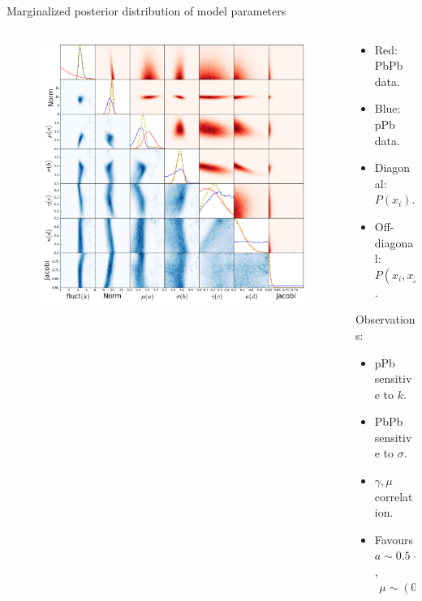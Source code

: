 \documentclass[11pt]{beamer}
\begin{document}
\begin{frame}{Marginalized posterior distribution of model parameters}
\begin{columns}
\begin{column}{0.6\textwidth}
\begin{figure}
\begin{center}
\includegraphics[width = \textwidth]{./pics/corner.png}
\end{center}
\end{figure}
\end{column}
\begin{column}{0.4\textwidth}
\begin{itemize}
\item Red: PbPb data.
\item Blue: pPb data.
\item Diagonal: $P(x_i)$. 
\item Off-diagonal: $P(x_i, x_j)$.
\end{itemize}
Observations:
\begin{itemize}
\item pPb sensitive to $k$.
\item PbPb sensitive to $\sigma$.
\item $\gamma, \mu$ correlation. 
\item Favours $a \sim 0.5 - 1$,
\begin{eqnarray}
\nonumber \mu \sim (0.5 - 1)\mu_{\textrm{com}}(x_\perp).
\end{eqnarray}
\end{itemize}
\end{column}
\end{columns}
\end{frame}
\end{document}
